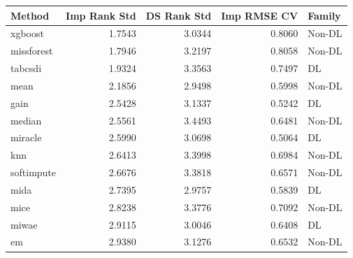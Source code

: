 \begin{tabular}{lrrrl}
\toprule
Method & Imp Rank Std & DS Rank Std & Imp RMSE CV & Family \\
\midrule
xgboost & 1.7543 & 3.0344 & 0.8060 & Non-DL \\
missforest & 1.7946 & 3.2197 & 0.8058 & Non-DL \\
tabcsdi & 1.9324 & 3.3563 & 0.7497 & DL \\
mean & 2.1856 & 2.9498 & 0.5998 & Non-DL \\
gain & 2.5428 & 3.1337 & 0.5242 & DL \\
median & 2.5561 & 3.4493 & 0.6481 & Non-DL \\
miracle & 2.5990 & 3.0698 & 0.5064 & DL \\
knn & 2.6413 & 3.3998 & 0.6984 & Non-DL \\
softimpute & 2.6676 & 3.3818 & 0.6571 & Non-DL \\
mida & 2.7395 & 2.9757 & 0.5839 & DL \\
mice & 2.8238 & 3.3776 & 0.7092 & Non-DL \\
miwae & 2.9115 & 3.0046 & 0.6408 & DL \\
em & 2.9380 & 3.1276 & 0.6532 & Non-DL \\
\bottomrule
\end{tabular}
